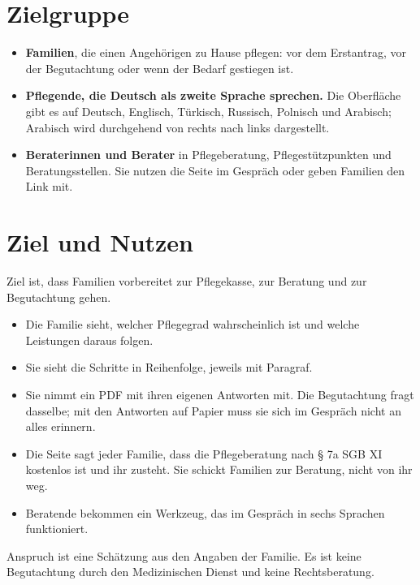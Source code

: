 \documentclass[11pt,a4paper,parskip=half-]{scrartcl}
\begin{document}
\section{Zielgruppe}
%
\begin{itemize}
  \item \textbf{Familien}, die einen Angehörigen zu Hause pflegen: vor dem Erstantrag,
        vor der Begutachtung oder wenn der Bedarf gestiegen ist.
  \item \textbf{Pflegende, die Deutsch als zweite Sprache sprechen.}
        Die Oberfläche gibt es auf Deutsch, Englisch, Türkisch, Russisch, Polnisch und Arabisch;
        Arabisch wird durchgehend von rechts nach links dargestellt.
  \item \textbf{Beraterinnen und Berater} in Pflegeberatung, Pflegestützpunkten und
        Beratungsstellen. Sie nutzen die Seite im Gespräch oder geben Familien den Link mit.
\end{itemize}

\section{Ziel und Nutzen}
Ziel ist, dass Familien vorbereitet zur Pflegekasse, zur Beratung und zur Begutachtung gehen.
\begin{itemize}
  \item Die Familie sieht, welcher Pflegegrad wahrscheinlich ist und welche Leistungen daraus folgen.
  \item Sie sieht die Schritte in Reihenfolge, jeweils mit Paragraf.
  \item Sie nimmt ein PDF mit ihren eigenen Antworten mit. Die Begutachtung fragt dasselbe;
        mit den Antworten auf Papier muss sie sich im Gespräch nicht an alles erinnern.
  \item Die Seite sagt jeder Familie, dass die Pflegeberatung nach § 7a SGB XI kostenlos ist und
        ihr zusteht. Sie schickt Familien zur Beratung, nicht von ihr weg.
  \item Beratende bekommen ein Werkzeug, das im Gespräch in sechs Sprachen funktioniert.
\end{itemize}
Anspruch ist eine Schätzung aus den Angaben der Familie.
Es ist keine Begutachtung durch den Medizinischen Dienst und keine Rechtsberatung.

\end{document}
